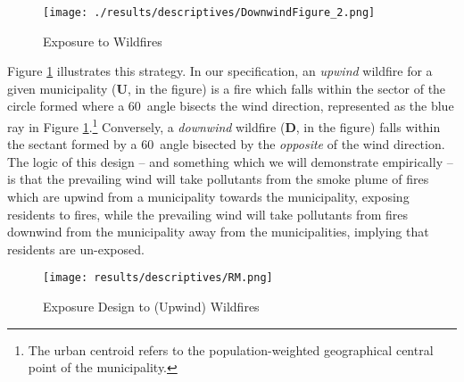 \documentclass[11pt]{article}
\begin{document}
\begin{spacing}{1.5}
\begin{figure}[htpb!]
    \centering
    \vspace{1mm}
    \texttt{[image: ./results/descriptives/DownwindFigure\_2.png]}
    \caption{Exposure to Wildfires}
    \label{fig:Downwind_Fig}
    \vspace{2mm}
\end{figure}

Figure \ref{fig:Downwind_Fig} illustrates this strategy. In our specification, an \textit{upwind} wildfire for a given municipality (\textbf{U}, in the figure) is a fire which falls within the sector of the circle formed where a 60\textdegree\  angle bisects the wind direction, represented as the blue ray in Figure \ref{fig:Downwind_Fig}.\footnote{The urban centroid refers to the population-weighted geographical central point of the municipality.} %
Conversely, a \textit{downwind} wildfire (\textbf{D}, in the figure) falls within the sectant formed by a 60\textdegree\ angle bisected by the \emph{opposite} of the wind direction.  The logic of this design -- and something which we will demonstrate empirically -- is that the prevailing wind will take pollutants from the smoke plume of fires which are upwind from a municipality towards the municipality, exposing residents to fires, while the prevailing wind will take pollutants from fires downwind from the municipality away from the municipalities, implying that residents are un-exposed.

\begin{figure}[htpb!]
    \centering
    \texttt{[image: results/descriptives/RM.png]}
    \caption{Exposure Design to (Upwind) Wildfires}
    \label{fig:design2}
\end{figure}    


\end{spacing}
\end{document}
